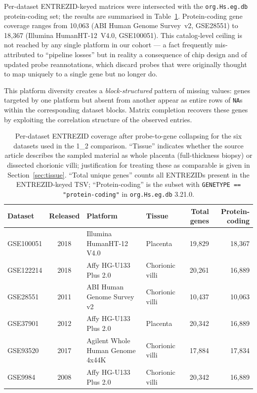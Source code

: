 \documentclass[11pt,a4paper]{article}
\begin{document}
Per-dataset ENTREZID-keyed matrices were intersected with the
\texttt{org.Hs.eg.db} protein-coding set; the results are
summarised in Table~\ref{tab:platforms}. Protein-coding gene
coverage ranges from 10{,}063 (ABI Human Genome Survey~v2,
GSE28551) to 18{,}367 (Illumina HumanHT-12~V4.0, GSE100051).
This catalog-level ceiling is not reached by any single
platform in our cohort --- a fact frequently mis-attributed to
``pipeline losses'' but in reality a consequence of chip design
and of updated probe reannotations, which discard probes that
were originally thought to map uniquely to a single gene but
no longer do.

This platform diversity creates a \emph{block-structured}
pattern of missing values: genes targeted by one platform but
absent from another appear as entire rows of \texttt{NA}s within
the corresponding dataset blocks. Matrix completion recovers
these genes by exploiting the correlation structure of the
observed entries.

\begin{table}[h]
\centering
\footnotesize
\begin{tabularx}{\textwidth}{@{}l c X l r r@{}}
\toprule
\textbf{Dataset} & \textbf{Released} & \textbf{Platform} &
  \textbf{Tissue} &
  \textbf{Total genes} & \textbf{Protein-coding} \\
\midrule
GSE100051 \citep{Soncin2018}  & 2018 & Illumina HumanHT-12 V4.0          & Placenta        & 19{,}829 & 18{,}367 \\
GSE122214 \citep{Zhao2019}    & 2018 & Affy HG-U133 Plus 2.0             & Chorionic villi & 20{,}261 & 16{,}889 \\
GSE28551  \citep{Sitras2012}  & 2011 & ABI Human Genome Survey v2        & Chorionic villi & 10{,}437 & 10{,}063 \\
GSE37901  \citep{Uuskula2012} & 2012 & Affy HG-U133 Plus 2.0             & Placenta        & 20{,}342 & 16{,}889 \\
GSE93520  \citep{Zhang2017}   & 2017 & Agilent Whole Human Genome 4x44K  & Chorionic villi & 17{,}884 & 17{,}834 \\
GSE9984   \citep{Mikheev2008} & 2008 & Affy HG-U133 Plus 2.0             & Chorionic villi & 20{,}342 & 16{,}889 \\
\bottomrule
\end{tabularx}
\caption{Per-dataset ENTREZID coverage after probe-to-gene
  collapsing for the six datasets used in the 1\_2 comparison.
  ``Tissue'' indicates whether the source article describes the
  sampled material as whole placenta (full-thickness biopsy) or
  dissected chorionic villi; justification for treating these as
  comparable is given in Section~\ref{sec:tissue}.
  ``Total unique genes'' counts all ENTREZIDs present in the
  ENTREZID-keyed TSV; ``Protein-coding'' is the subset with
  \texttt{GENETYPE == "protein-coding"} in
  \texttt{org.Hs.eg.db} 3.21.0.}
\label{tab:platforms}
\end{table}
\end{document}
